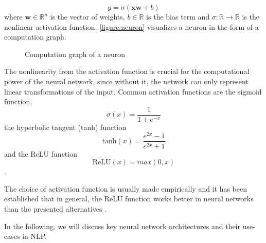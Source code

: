 \begin{equation}
    y = \sigma(\mathbf{x}\mathbf{w} + b)
\end{equation}
where \(\mathbf{w} \in \mathbb{R}^n\) is the vector of weights, 
\(b \in \mathbb{R}\) is the bias term and 
\(\sigma: \mathbb{R} \rightarrow \mathbb{R}\) is the nonlinear activation
function. \autoref{figure:neuron} visualizes a neuron in the 
form of a computation graph.

\begin{figure}
    \centering
    
    \caption{Computation graph of a neuron}
    \label{figure:neuron}
\end{figure}

The nonlinearity from the activation function is crucial 
for the computational power of the neural network, since without 
it, the network can only represent linear transformations of
the input. Common activation 
functions are the sigmoid function,
\[\sigma(x)=\frac{1}{1+e^{-x}}\]
the hyperbolic tangent (tanh) function 
\[\textrm{tanh}(x)= \frac{e^{2x}-1}{e^{2x} + 1}\] and 
the \ac{ReLU} function
\[\textrm{ReLU}(x) = max(0, x)\].

The choice of activation function is usually made empirically and 
it has been established that in general, the ReLU function 
works better in neural networks than the presented alternatives \parencite{goldberg2016primer}.

In the following, we will discuss key neural network
architectures and their use-cases in \ac{NLP}.

